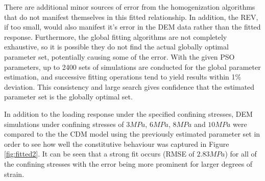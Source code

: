 There are additional minor sources of error from the homogenization algorithms that do not manifest themselves in this fitted relationship.  In addition, the REV, if too small, would also manifest it's error in the DEM data rather than the fitted response. Furthermore, the global fitting algorithms are not completely exhaustive, so it is possible they do not find the actual globally optimal parameter set, potentially causing some of the error. With the given PSO parameters, up to 2400 sets of simulations are conducted for the global parameter estimation, and successive fitting operations tend to yield results within 1\% deviation. This consistency and large search gives confidence that the estimated parameter set is the globally optimal set. 

In addition to the loading response under the specified confining stresses, DEM simulations under confining stresses of $3MPa$, $6MPa$, $8MPa$ and $10MPa$ were compared to the the CDM model using the previously estimated parameter set in order to see how well the constitutive behaviour was captured in Figure \ref{fig:fitted2}. It can be seen that a strong fit occurs (RMSE of $2.83MPa$) for all of the confining stresses with the error being more prominent for larger degrees of strain.